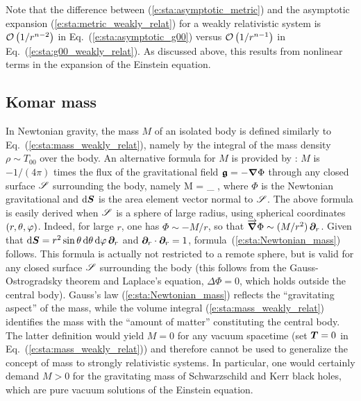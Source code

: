Note that the difference between (\ref{e:sta:asymptotic_metric})
and the asymptotic expansion (\ref{e:sta:metric_weakly_relat}) for
a weakly relativistic system is
$\mathcal{O}\left( {1}/{r^{n-2}} \right)$ in Eq.~(\ref{e:sta:asymptotic_g00})
versus $\mathcal{O}\left( {1}/{r^{n-1}} \right)$ in Eq.~(\ref{e:sta:g00_weakly_relat}).
As discussed above, this results from nonlinear terms in the expansion of the Einstein equation.


\subsection{Komar mass} \label{s:sta:Komar_mass}

In Newtonian gravity, the mass $M$ of an isolated body is defined
similarly to Eq.~(\ref{e:sta:mass_weakly_relat}), namely by the integral
of the mass density $\rho \sim T_{00}$ over the body. An alternative formula
for $M$ is provided by : $M$ is $-1/(4\pi)$ times the flux of the gravitational field $\bm{\mathfrak{g}} = - \bm{\nabla}\Phi$
through any closed surface $\mathscr{S}$ surrounding the body, namely
\be \label{e:sta:Newtonian_mass}
    M =  \int_{\Sp} \vw{\nabla}{\Phi}\cdot \D {} ,
\ee
where $\Phi$ is the Newtonian gravitational and
$\mathrm{d} \bm{S}$ is the area element vector normal to $\mathscr{S}$. The above formula
is easily derived when $\mathscr{S}$ is a sphere of large radius, using spherical coordinates
$(r,\theta,\varphi)$. Indeed, for large $r$,
one has $\Phi \sim - M/r$, so that $\overrightarrow{\bm{\nabla}}\Phi \sim (M/r^2) \, \bm{\partial}_r$. Given that
$\mathrm{d} \bm{S} = r^2 \sin\theta \, \mathrm{d}\theta\, \mathrm{d}\varphi\, \bm{\partial}_r$ and $\bm{\partial}_r\cdot\bm{\partial}_r = 1$,
formula~(\ref{e:sta:Newtonian_mass}) follows. This formula is
actually not restricted to a remote sphere, but is valid for any closed surface
$\mathscr{S}$ surrounding the body (this follows from the Gauss-Ostrogradsky theorem and Laplace's equation, $\Delta \Phi = 0$, which holds outside the central body).
Gauss's law (\ref{e:sta:Newtonian_mass}) reflects the ``gravitating aspect'' of the mass, while the
volume integral (\ref{e:sta:mass_weakly_relat}) identifies the mass with the ``amount of matter'' constituting
the central body. The latter definition would yield $M=0$ for any vacuum spacetime
(set $\bm{T}=0$ in Eq.~(\ref{e:sta:mass_weakly_relat})) and therefore cannot be used to generalize
the concept of mass to strongly relativistic systems. In  particular, one would certainly
demand $M > 0$ for the gravitating mass of Schwarzschild and Kerr black holes, which are pure vacuum solutions of the Einstein equation.

